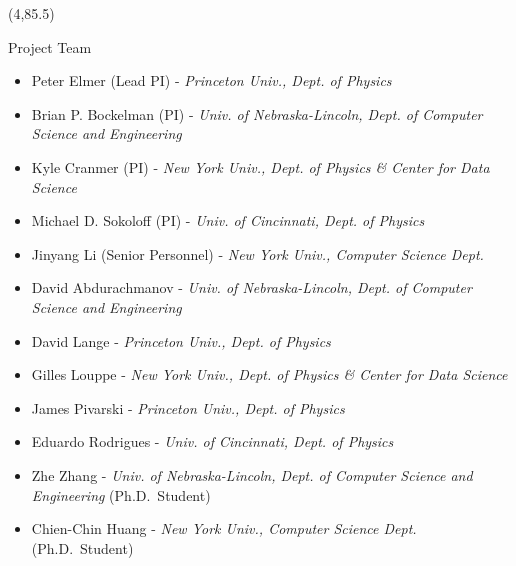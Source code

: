 \documentclass[final]{beamer}
\begin{document}
\begin{frame}{}
\begin{textblock}{38.0}(4,85.5)
\begin{block}{Project Team}
\begin{itemize}
\item Peter Elmer (Lead PI) - {\it Princeton Univ., Dept. of Physics}
\item Brian P. Bockelman (PI) - {\it Univ. of Nebraska-Lincoln, Dept. of Computer Science and Engineering}
\item Kyle Cranmer (PI) - {\it New York Univ., Dept. of Physics \& Center for Data Science}
\item Michael D. Sokoloff (PI) - {\it Univ. of Cincinnati, Dept. of Physics}
\item Jinyang Li (Senior Personnel) - {\it New York Univ., Computer Science Dept.}
\item David Abdurachmanov - {\it Univ. of Nebraska-Lincoln, Dept. of Computer Science and Engineering}
\item David Lange - {\it Princeton Univ., Dept. of Physics}
\item Gilles Louppe - {\it New York Univ., Dept. of Physics \& Center for Data Science}
\item James Pivarski - {\it Princeton Univ., Dept. of Physics}
\item Eduardo Rodrigues - {\it Univ. of Cincinnati, Dept. of Physics}
\item Zhe Zhang - {\it Univ. of Nebraska-Lincoln, Dept. of Computer Science and Engineering} (Ph.D.\ Student)
\item Chien-Chin Huang - {\it New York Univ., Computer Science Dept.} (Ph.D.\ Student) 
\end{itemize}
\end{block}
\end{textblock}




\end{frame}
\end{document}
